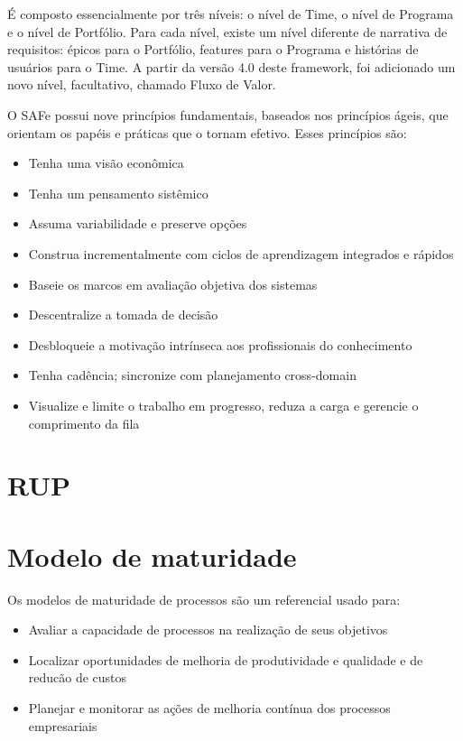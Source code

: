 É composto essencialmente por três níveis: o nível de Time, o nível de Programa e o nível de Portfólio. Para cada nível, existe um nível diferente de narrativa de requisitos: épicos para o Portfólio, features para o Programa e histórias de usuários para o Time. A partir da versão 4.0 deste framework, foi adicionado um novo nível, facultativo, chamado Fluxo de Valor.

O SAFe possui nove princípios fundamentais, baseados nos princípios ágeis, que orientam os papéis e práticas que o tornam efetivo. Esses princípios são:
\begin{itemize}
\item Tenha uma visão econômica
\item Tenha um pensamento sistêmico
\item Assuma variabilidade e preserve opções
\item Construa incrementalmente com ciclos de aprendizagem integrados e rápidos
\item Baseie os marcos em avaliação objetiva dos sistemas 	
\item Descentralize a tomada de decisão
\item Desbloqueie a motivação intrínseca aos profissionais do conhecimento
\item Tenha cadência; sincronize com planejamento cross-domain
\item Visualize e limite o trabalho em progresso, reduza a carga e gerencie o comprimento da fila
\end{itemize}

  \section{RUP}
  \section{Modelo de maturidade}
  Os modelos de maturidade de processos são um referencial usado para:
\begin{itemize}
\item Avaliar a capacidade de processos na realização de seus objetivos
\item Localizar oportunidades de melhoria de produtividade e qualidade e de reducão de custos
\item Planejar e monitorar as ações de melhoria contínua dos processos empresariais
\end{itemize}

